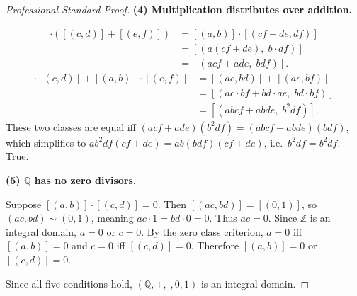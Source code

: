 \begin{proof}[Professional Standard Proof]
\textbf{(4) Multiplication distributes over addition.}

\begin{align*}
[(a,b)]\cdot([(c,d)]+[(e,f)])
&= [(a,b)]\cdot[(cf+de,df)] \\
&= [(a(cf+de),\; b\cdot df)] \\
&= [(acf+ade,\; bdf)].
\end{align*}
\begin{align*}
[(a,b)]\cdot[(c,d)] + [(a,b)]\cdot[(e,f)]
&= [(ac,bd)] + [(ae,bf)] \\
&= [(ac\cdot bf + bd\cdot ae,\; bd\cdot bf)] \\
&= [(abcf + abde,\; b^2df)].
\end{align*}
These two classes are equal iff $(acf+ade)(b^2df) = (abcf+abde)(bdf)$,
which simplifies to $ab^2df(cf+de) = ab(bdf)(cf+de)$, i.e.\ $b^2df = b^2df$.
True.

\textbf{(5) $\mathbb{Q}$ has no zero divisors.}

Suppose $[(a,b)]\cdot[(c,d)] = 0$. Then $[(ac,bd)] = [(0,1)]$, so
$(ac,bd)\sim(0,1)$, meaning $ac\cdot 1 = bd\cdot 0 = 0$. Thus $ac = 0$.
Since $\mathbb{Z}$ is an integral domain, $a=0$ or $c=0$. By the zero class
criterion, $a=0$ iff $[(a,b)] = 0$ and $c=0$ iff $[(c,d)] = 0$.
Therefore $[(a,b)]=0$ or $[(c,d)]=0$.

Since all five conditions hold, $(\mathbb{Q},+,\cdot,0,1)$ is an integral domain.
\end{proof}

